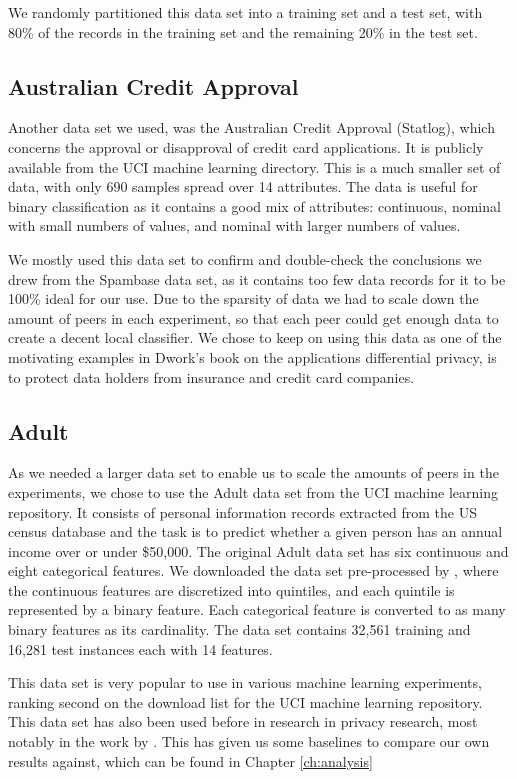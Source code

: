 We randomly partitioned this data set into a training set and a test set, with 80\% of the records in the training set and the remaining 20\% in the test set.

\subsection{Australian Credit Approval}
Another data set we used, was the Australian Credit Approval (Statlog)\citep{australian1987data}, which concerns the approval or disapproval of credit card applications. It is publicly available from the UCI machine learning directory. This is a much smaller set of data, with only 690 samples spread over 14 attributes. The data is useful for binary classification as it contains a good mix of attributes: continuous, nominal with small numbers of values, and nominal with larger numbers of values.

We mostly used this data set to confirm and double-check the conclusions we drew from the Spambase data set, as it contains too few data records for it to be 100\% ideal for our use. Due to the sparsity of data we had to scale down the amount of peers in each experiment, so that each peer could get enough data to create a decent local classifier. We chose to keep on using this data as one of the motivating examples in Dwork's book\citep{dwork2013algorithmic} on the applications differential privacy, is to protect data holders from insurance and credit card companies. 


\subsection{Adult}
As we needed a larger data set to enable us to scale the amounts of peers in the experiments, we chose to use the Adult data set from the UCI machine learning repository.  It consists of personal information records extracted from the US census database and the task is to predict whether a given person has an annual income over or under \$50,000. The original Adult data set has six continuous and eight categorical features. We
downloaded the data set pre-processed by \cite{platt1999fast}, where the continuous features are discretized into quintiles, and each quintile is represented by a binary feature. Each categorical feature is converted to as many binary features as its cardinality. The data set contains 32,561 training and 16,281 test instances each with 14 features.

This data set is very popular to use in various machine learning experiments, ranking second on the download list for the UCI machine learning repository. This data set has also been used before in research in privacy research, most notably in the work by \cite{pathak2010diffprivhomo}. This has given us some baselines to compare our own results against, which can be found in Chapter \ref{ch:analysis}

